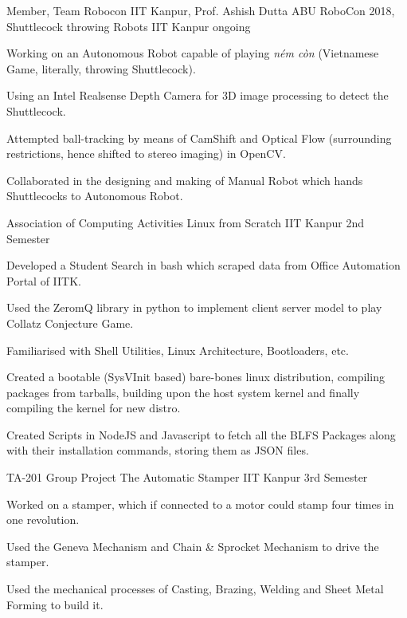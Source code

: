 \begin{cventries}

  \cventry
  {Member, Team Robocon IIT Kanpur, Prof. Ashish Dutta}
		{ABU RoboCon 2018, Shuttlecock throwing Robots}
  {IIT Kanpur}
  {ongoing}
  {
    \begin{cvitems}
	\item Working on an Autonomous Robot capable of playing \textit{ném còn} (Vietnamese Game, literally, throwing Shuttlecock).
	\item Using an Intel Realsense Depth Camera for 3D image processing to detect the Shuttlecock.
	\item Attempted ball-tracking by means of CamShift and Optical Flow (surrounding restrictions, hence shifted to stereo imaging) in OpenCV.
	\item Collaborated in the designing and making of Manual Robot which hands Shuttlecocks to Autonomous Robot. 
    \end{cvitems}
  }
  \cventry
  {Association of Computing Activities}
				{Linux from Scratch}
  {IIT Kanpur}
  {2nd Semester}
  {
    \begin{cvitems}
    \item Developed a Student Search in bash which scraped data from Office Automation Portal of IITK. 
    \item Used the ZeromQ library in python to implement client server model to play Collatz Conjecture Game.
    \item Familiarised with Shell Utilities, Linux Architecture, Bootloaders, etc.
	\item Created a bootable (SysVInit based) bare-bones linux distribution, compiling packages from tarballs, building upon the host system kernel and finally compiling the kernel for new distro.
	\item Created Scripts in NodeJS and Javascript to fetch all the BLFS Packages along with their installation commands, storing them as JSON files. 
    \end{cvitems}
  }
  
  	\cventry
  {TA-201 Group Project}
	{The Automatic Stamper}
  {IIT Kanpur}
  {3rd Semester}
  {
    \begin{cvitems}
    \item Worked on a stamper, which if connected to a motor could stamp four times in one revolution.
	\item Used the Geneva Mechanism and Chain \& Sprocket Mechanism to drive the stamper.
    \item Used the mechanical processes of Casting, Brazing, Welding and Sheet Metal Forming to build it.
    \end{cvitems}
  }

\end{cventries}

